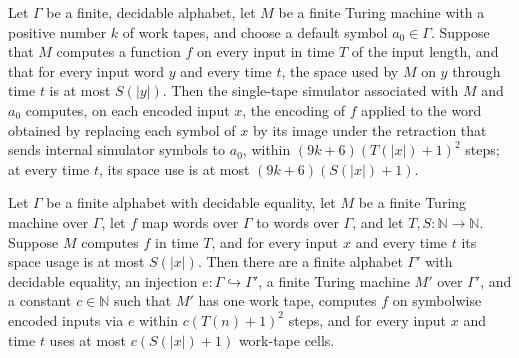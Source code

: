 \begin{lemma}
\label{Turing.FinTM.dg_all_inputs}
\leanok
{}
Let $\Gamma$ be a finite, decidable alphabet, let $M$ be a finite Turing machine with a
positive number $k$ of work tapes, and choose a default symbol $a_0\in\Gamma$. Suppose
that $M$ computes a function $f$ on every input in time $T$ of the input length, and
that for every input word $y$ and every time $t$, the space used by $M$ on $y$ through
time $t$ is at most $S(|y|)$. Then the single-tape simulator associated with $M$ and
$a_0$ computes, on each encoded input $x$, the encoding of $f$ applied to the word
obtained by replacing each symbol of $x$ by its image under the retraction that sends
internal simulator symbols to $a_0$, within $(9k+6)(T(|x|)+1)^2$ steps; at every time
$t$, its space use is at most $(9k+6)(S(|x|)+1)$.
\end{lemma}

\begin{theorem}
\label{Turing.FinTM.one_work_tape_spaceUsed}
\leanok
{}
Let $\Gamma$ be a finite alphabet with decidable equality, let $M$ be a finite Turing
machine over $\Gamma$, let $f$ map words over $\Gamma$ to words over $\Gamma$, and let
$T,S\colon\mathbb N\to\mathbb N$. Suppose $M$ computes $f$ in time $T$, and for every
input $x$ and every time $t$ its space usage is at most $S(|x|)$. Then there are a
finite alphabet $\Gamma'$ with decidable equality, an injection
$e\colon\Gamma\hookrightarrow\Gamma'$, a finite Turing machine $M'$ over $\Gamma'$, and
a constant $c\in\mathbb N$ such that $M'$ has one work tape, computes $f$ on symbolwise
encoded inputs via $e$ within $c(T(n)+1)^2$ steps, and for every input $x$ and time $t$
uses at most $c(S(|x|)+1)$ work-tape cells.
\end{theorem}


